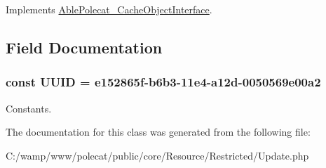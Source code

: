 Implements \hyperlink{interface_able_polecat___cache_object_interface_a3f2135f6ad45f51d075657f6d20db2cd}{Able\+Polecat\+\_\+\+Cache\+Object\+Interface}.



\subsection{Field Documentation}
\hypertarget{class_able_polecat___resource___restricted___update_a74b892c8c0b86bf9d04c5819898c51e7}{}
\subsubsection[{U\+U\+I\+D}]{\setlength{\rightskip}{0pt plus 5cm}const U\+U\+I\+D = \textquotesingle{}e152865f-\/b6b3-\/11e4-\/a12d-\/0050569e00a2\textquotesingle{}}\label{class_able_polecat___resource___restricted___update_a74b892c8c0b86bf9d04c5819898c51e7}
Constants. 

The documentation for this class was generated from the following file\+:\begin{DoxyCompactItemize}
\item 
C\+:/wamp/www/polecat/public/core/\+Resource/\+Restricted/Update.\+php\end{DoxyCompactItemize}
